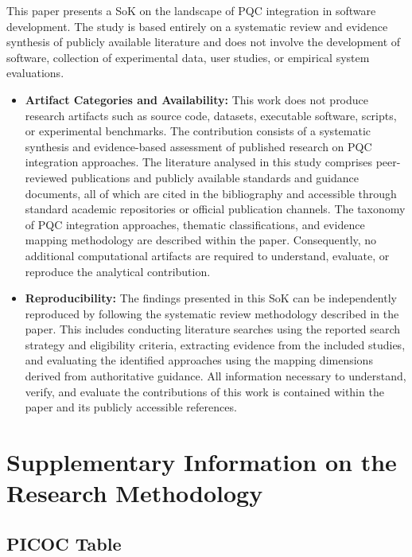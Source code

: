 \documentclass[letterpaper,twocolumn,10pt]{article}
\begin{document}
This paper presents a SoK on the landscape of PQC integration in software development. The study is based entirely on a systematic review and evidence synthesis of publicly available literature and does not involve the development of software, collection of experimental data, user studies, or empirical system evaluations.

\begin{itemize}
    \item \textbf{Artifact Categories and Availability: } This work does not produce research artifacts such as source code, datasets, executable software, scripts, or experimental benchmarks. The contribution consists of a systematic synthesis and evidence-based assessment of published research on PQC integration approaches. The literature analysed in this study comprises peer-reviewed publications and publicly available standards and guidance documents, all of which are cited in the bibliography and accessible through standard academic repositories or official publication channels. The taxonomy of PQC integration approaches, thematic classifications, and evidence mapping methodology are described within the paper. Consequently, no additional computational artifacts are required to understand, evaluate, or reproduce the analytical contribution.
    \item \textbf{Reproducibility: } The findings presented in this SoK can be independently reproduced by following the systematic review methodology described in the paper. This includes conducting literature searches using the reported search strategy and eligibility criteria, extracting evidence from the included studies, and evaluating the identified approaches using the mapping dimensions derived from authoritative guidance. All information necessary to understand, verify, and evaluate the contributions of this work is contained within the paper and its publicly accessible references.
\end{itemize}




\appendix
\section{Supplementary Information on the Research Methodology}
\label{appendix:Methodology}

\subsection{PICOC Table}
\label{picocTable}
\end{document}
